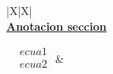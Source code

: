 \documentclass[../main.tex]{subfiles}
\begin{document}
\vspace*{-\baselineskip}
\vspace*{-\baselineskip}
\begin{xltabular}{\textwidth}{|X|X|}
  \hline
  \\
  \hline
  \underline{\textbf{Anotacion seccion}}

  $\begin{aligned}
       & ecua1 \\
       & ecua2 \\
    \end{aligned}$
  \newline\newline
  &
   \\
  \hline
\end{xltabular}
\end{document}
